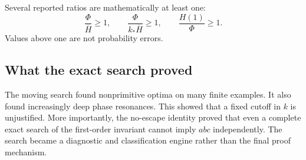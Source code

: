 Several reported ratios are mathematically at least one:
\[
 \frac{\Phi}{\overline H}\ge1,
 \qquad
 \frac{\Phi}{k_*\overline H}\ge1,
 \qquad
 \frac{H(1)}{\Phi}\ge1.
\]
Values above one are not probability errors.

\subsection{What the exact search proved}
The moving search found nonprimitive optima on many finite examples. It also found increasingly deep phase resonances. This showed that a fixed cutoff in $k$ is unjustified. More importantly, the no-escape identity proved that even a complete exact search of the first-order invariant cannot imply $abc$ independently. The search became a diagnostic and classification engine rather than the final proof mechanism.
